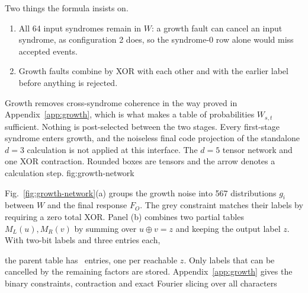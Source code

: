 Two things the formula insists on.
\begin{enumerate}
\item All 64 input syndromes remain in $W$: a growth fault can cancel an input syndrome, as configuration 2 does, so the syndrome-0 row alone would miss accepted events. 
\item Growth faults combine by XOR with each other and with the earlier label before anything is rejected. 
\end{enumerate}
Growth removes cross-syndrome coherence in the way proved in Appendix~\ref{app:growth}, which is what makes a table of probabilities $W_{s,t}$ sufficient. 
Nothing is post-selected between the two stages. Every first-stage syndrome enters growth, and the noiseless final code projection of the standalone $d=3$ calculation is not applied at this interface.
{The $d=5$ tensor network and one XOR contraction. Rounded boxes are tensors and the arrow denotes a calculation step.}
{fig:growth-network}

Fig.~\ref{fig:growth-network}(a) groups the growth noise into 567 distributions $g_i$ between $W$ and the final response $F_O$. The grey constraint matches their labels by requiring a zero total XOR. Panel (b) combines two partial tables $M_L(u),M_R(v)$ by summing over $u\oplus v=z$ and keeping the output label $z$. With two-bit labels and three entries each,
{\color{black}
\begin{center}\small\end{center}}
the parent table has \joinentries\ entries, one per reachable $z$. Only labels that can be cancelled by the remaining factors are stored. Appendix~\ref{app:growth} gives the binary constraints, contraction and exact Fourier slicing over all characters
